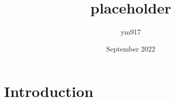 \documentclass{article}
\title{placeholder}
\author{ym917 }
\date{September 2022}
\begin{document}
\maketitle

\section{Introduction}
\end{document}
